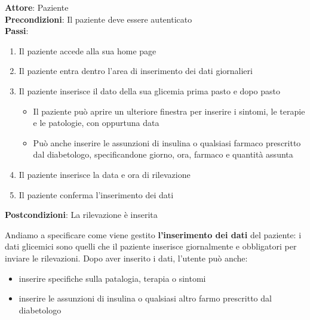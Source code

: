 \documentclass[a4paper]{article}
\begin{document}
\begin{mdframed}
  \textbf{Attore}: Paziente\\
  \textbf{Precondizioni}: Il paziente deve essere autenticato\\
  \textbf{Passi}: 
  \begin{enumerate}[nosep]
    \item Il paziente accede alla sua home page
    \item Il paziente entra dentro l'area di inserimento dei dati giornalieri
    \item  Il paziente inserisce il dato della sua glicemia prima pasto e dopo pasto
      \begin{itemize}
        \item  Il paziente può aprire un ulteriore finestra per inserire i sintomi, le terapie e le patologie, con oppurtuna data 
        \item  Può anche inserire le assunzioni di insulina o qualsiasi farmaco prescritto dal diabetologo, specificandone giorno, ora, farmaco e quantità assunta
      \end{itemize}
    \item Il paziente inserisce la data e ora di rilevazione
    \item Il paziente conferma l'inserimento dei dati
  \end{enumerate}
  \textbf{Postcondizioni}: La rilevazione è inserita 
\end{mdframed}
\noindent
Andiamo a specificare come viene gestito \textbf{l'inserimento dei dati} del paziente: i dati glicemici sono quelli
che il paziente inserisce giornalmente e obbligatori per inviare le rilevazioni. Dopo aver inserito i dati, l'utente può anche:
\begin{itemize}
  \item inserire specifiche sulla patalogia, terapia o sintomi
  \item inserire le assunzioni di insulina o qualsiasi altro farmo prescritto dal diabetologo
\end{itemize}
\end{document}
